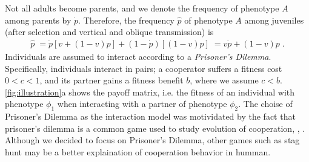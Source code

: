 \documentclass[12pt]{extarticle}
\begin{document}
Not all adults become parents, and we denote the frequency of phenotype $A$ among parents by $\dot{p}$.
Therefore, the frequency $\hat{p}$ of  phenotype $A$ among juveniles (after selection and vertical and oblique transmission) is
\begin{equation}\label{eq:horizontal}
\begin{aligned}
\hat{p} \;=
\dot{p} [v + (1-v)p] + (1-\dot{p}) [(1-v)p] \;= 
v \dot{p} + (1-v) p \;.
\end{aligned}
\end{equation}
Individuals are assumed to interact according to a \emph{Prisoner's Dilemma}.
Specifically, individuals interact in pairs; a cooperator suffers a fitness cost $0<c<1$, and its partner gains a fitness benefit $b$, where we assume $c<b$. \autoref{fig:illustration}a shows the payoff matrix, i.e. the fitness of an individual with phenotype $\phi_1$ when interacting with a partner of phenotype $\phi_2$.
The choise of Prisoner's Dilemma as the interaction model was motividated by the fact that prisoner's dilemma is a common game used to study evolution of cooperation\citep{axelrod1981evolution}, \citep{milinski1987tit}, \citep{nowak1992tit}.
Although we decided to focus on Prisoner's Dilemma, other games such as stag hunt\citep{skyrms2004stag} may be a better explaination of cooperation behavior in humman\citep{tomasello2012two}.
\end{document}

